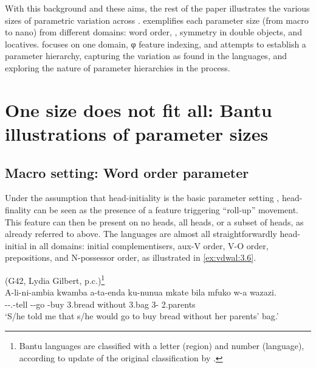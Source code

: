 \documentclass[output=paper]{langsci/langscibook}
\begin{document}
With this background and these aims, the rest of the paper illustrates the
various sizes of parametric variation across .
 exemplifies each parameter size (from macro to nano) from
different domains: word order, , symmetry in
double objects, and locatives.   focuses on one domain, φ
feature indexing, and attempts to establish a parameter
hierarchy, capturing the variation as found in the
 languages, and exploring the nature of parameter hierarchies in the
process.

\section{One size does not fit all: Bantu illustrations of parameter
sizes}\label{sec:3.2}

\subsection{Macro setting: Word order parameter}\label{sub:3.2.1}

Under the assumption that head-initiality is the basic parameter setting
\citep{Kayne1994}, head-finality can be seen as the presence of a
 feature triggering “roll-up” movement. This
feature can then be present on no heads, all heads, or a subset of heads, as
already referred to above. The  languages are almost all straightforwardly
head-initial in all domains: initial complementisers, aux-V order, V-O order,
prepositions, and N-possessor order, as illustrated in \eqref{ex:vdwal:3.6}.

\ea\label{bkm:Ref343702566} (G42, Lydia Gilbert, p.c.)\footnote{Bantu languages are classified with a letter (region) and number (language), according to  update of the original classification by \citet{Guthrie1948}.}\\
    \gll    A-li-ni-ambia  kwamba  a-ta-enda  ku-nunua  mkate bila  mfuko  w-a  wazazi.\\
            \First\Sm{}{}-\Pst-\Fsg{}.\Om{}-tell  \Comp{}  \First\Sm{}-\Fut-go \Inf{}-buy  3.bread without  3.bag  3-\Conn{}  2.parents\\
    \glt    ‘S/he told me that s/he would go to buy bread without her parents’ bag.’
\z
\end{document}
